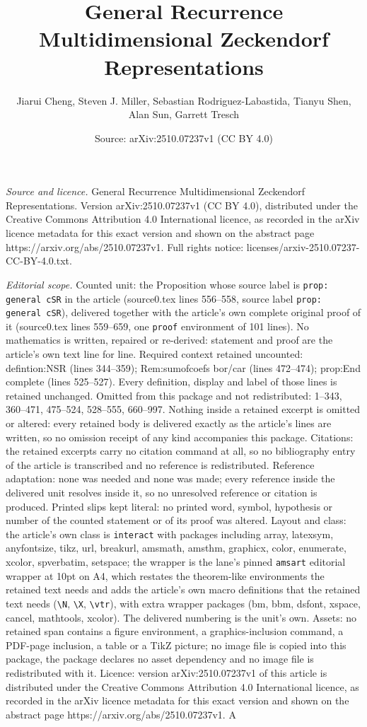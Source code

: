 \documentclass[10pt,a4paper]{amsart}
\title[General Recurrence Multidimensional Zeckendorf Representatio]{General Recurrence Multidimensional Zeckendorf Representations}
\author{Jiarui Cheng, Steven J. Miller, Sebastian Rodriguez-Labastida, Tianyu Shen, Alan Sun, Garrett Tresch}
\date{Source: arXiv:2510.07237v1 (CC BY 4.0)}
\begin{document}
\maketitle

\noindent\emph{Source and licence.} General Recurrence Multidimensional Zeckendorf Representations. Version arXiv:2510.07237v1 (CC BY 4.0), distributed under the Creative Commons Attribution 4.0 International licence, as recorded in the arXiv licence metadata for this exact version and shown on the abstract page https://arxiv.org/abs/2510.07237v1. Full rights notice: licenses/arxiv-2510.07237-CC-BY-4.0.txt.\par\smallskip

\noindent\textit{Editorial scope.} Counted unit: the Proposition whose source label is \texttt{prop: general cSR} in the article (source0.tex lines 556--558, source label \texttt{prop: general cSR}), delivered together with the article's own complete original proof of it (source0.tex lines 559--659, one \texttt{proof} environment of 101 lines). No mathematics is written, repaired or re-derived: statement and proof are the article's own text line for line. Required context retained uncounted: defintion:NSR (lines 344--359); Rem:sumofcoefs bor/car (lines 472--474); prop:End complete (lines 525--527). Every definition, display and label of those lines is retained unchanged. Omitted from this package and not redistributed: 1--343, 360--471, 475--524, 528--555, 660--997. Nothing inside a retained excerpt is omitted or altered: every retained body is delivered exactly as the article's lines are written, so no omission receipt of any kind accompanies this package. Citations: the retained excerpts carry no citation command at all, so no bibliography entry of the article is transcribed and no reference is redistributed. Reference adaptation: none was needed and none was made; every reference inside the delivered unit resolves inside it, so no unresolved reference or citation is produced. Printed slips kept literal: no printed word, symbol, hypothesis or number of the counted statement or of its proof was altered. Layout and class: the article's own class is \texttt{interact} with packages including array, latexsym, anyfontsize, tikz, url, breakurl, amsmath, amsthm, graphicx, color, enumerate, xcolor, spverbatim, setspace; the wrapper is the lane's pinned \texttt{amsart} editorial wrapper at 10pt on A4, which restates the theorem-like environments the retained text needs and adds the article's own macro definitions that the retained text needs (\texttt{\textbackslash N}, \texttt{\textbackslash X}, \texttt{\textbackslash vtr}), with extra wrapper packages (bm, bbm, dsfont, xspace, cancel, mathtools, xcolor). The delivered numbering is the unit's own. Assets: no retained span contains a figure environment, a graphics-inclusion command, a PDF-page inclusion, a table or a TikZ picture; no image file is copied into this package, the package declares no asset dependency and no image file is redistributed with it. Licence: version arXiv:2510.07237v1 of this article is distributed under the Creative Commons Attribution 4.0 International licence, as recorded in the arXiv licence metadata for this exact version and shown on the abstract page https://arxiv.org/abs/2510.07237v1. A 
\end{document}
